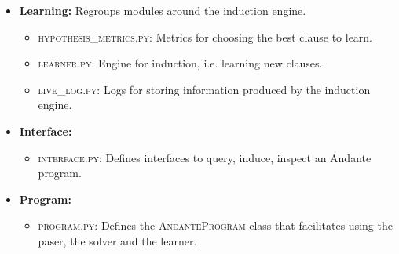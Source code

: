 \documentclass{article}
\begin{document}
\begin{itemize}
    \item \textbf{Learning:} Regroups modules around the induction engine.
    \begin{itemize}
        \item \textsc{hypothesis\_metrics.py}: Metrics for choosing the best
            clause to learn.
        \item \textsc{learner.py}: Engine for induction, i.e. learning new
            clauses.
        \item \textsc{live\_log.py}: Logs for storing information produced by
            the induction engine.
    \end{itemize}
    
    \item \textbf{Interface:}
    \begin{itemize}
        \item \textsc{interface.py}: Defines interfaces to query, induce,
            inspect an Andante program.
    \end{itemize}
    
    \item \textbf{Program:}
    \begin{itemize}
        \item \textsc{program.py}: Defines the \textsc{AndanteProgram} class
            that facilitates using the paser, the solver and the learner.
    \end{itemize}
    
\end{itemize}




\end{document}
